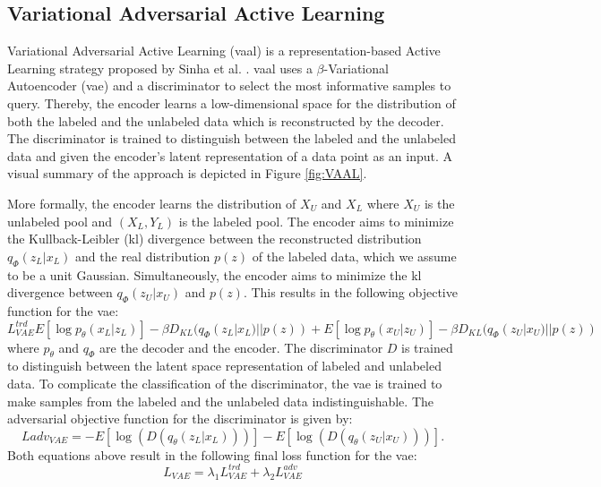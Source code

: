\subsection{Variational Adversarial Active Learning}
\label{sec:Related_work:Active_Learning:VAAL}
Variational Adversarial Active Learning (\gls{vaal}) is a representation-based Active Learning strategy proposed by Sinha et al. \cite{sinha2019variational}. 
\gls{vaal} uses a $\beta$-Variational Autoencoder (\gls{vae}) \cite{higgins2017beta} and a discriminator to select the most informative samples to query.
Thereby, the encoder learns a low-dimensional space for the distribution of both the labeled and the unlabeled data which is reconstructed by the decoder. 
The discriminator is trained to distinguish between the labeled and the unlabeled data and given the encoder's latent representation of a data point as an
input. A visual summary of the approach is depicted in Figure \ref{fig:VAAL}. \par
More formally, the encoder learns the distribution of $X_U$ and $X_L$ where $X_U$ is the unlabeled pool and $(X_L,Y_L)$ is the labeled pool. The encoder
aims to minimize the Kullback-Leibler (\gls{kl}) divergence \cite{goldberger2004hierarchical} between the reconstructed distribution $q_\Phi (z_L | x_L)$ and
the real distribution $p(z)$ of the labeled data, which we assume to be a unit Gaussian. Simultaneously, the encoder aims to minimize the \gls{kl} divergence
between $q_\Phi (z_U | x_U)$ and $p(z)$. This results in the following objective function for the \gls{vae}:
\begin{equation}
    L^{trd}_{VAE} E[\log p_\theta (x_L | z_L)] - \beta D_{KL} (q_\Phi (z_L | x_L) || p(z)) + E[\log p_\theta (x_U | z_U)] - \beta D_{KL} (q_\Phi (z_U | x_U) || p(z))
\end{equation}
where $p_\theta$ and $q_\Phi$ are the decoder and the encoder. The discriminator $D$ is trained to distinguish between the latent space representation
of labeled and unlabeled data. To complicate the classification of the discriminator, the \gls{vae} is trained to make samples from the labeled and the
unlabeled data indistinguishable. The adversarial objective function for the discriminator is given by:
\begin{equation}
    L{adv}_{VAE} = - E[\log(D(q_\theta (z_L | x_L)))] - E[\log(D(q_\theta(z_U | x_U)))].
\end{equation}
Both equations above result in the following final loss function for the \gls{vae}:
\begin{equation}
    L_{VAE} = \lambda_1 L^{trd}_{VAE} + \lambda_2 L^{adv}_{VAE}
\end{equation}
